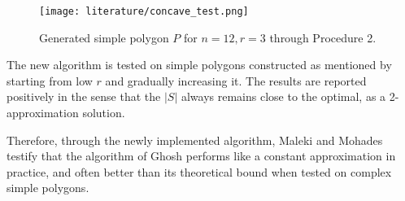 \begin{figure}[h!]
    \centering
    \texttt{[image: literature/concave\_test.png]}
    \caption{Generated simple polygon $P$ for $n = 12, r = 3$ \cite{maleki2022implementation} through Procedure 2.}
    \label{fig:arbitrary}
\end{figure}

The new algorithm is tested on simple polygons constructed as mentioned by starting from low $r$ and gradually increasing it. The results are reported positively in the sense that the $|S|$ always remains close to the optimal, as a 2-approximation solution.

Therefore, through the newly implemented algorithm, Maleki and Mohades \cite{maleki2022implementation} testify that the algorithm of Ghosh \cite{GHOSH2010718} performs like a constant approximation in practice, and often better than its theoretical bound when tested on complex simple polygons.
